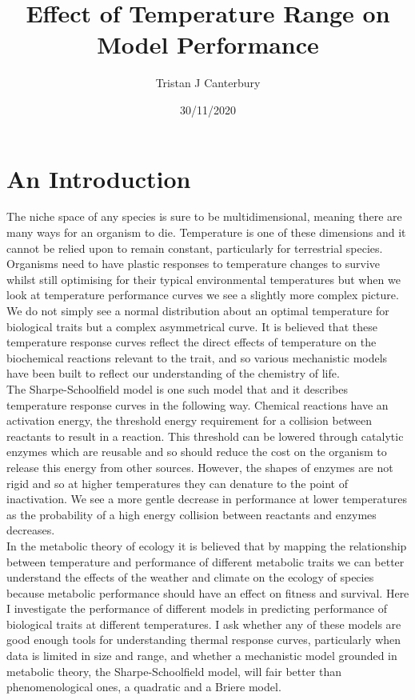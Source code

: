 \documentclass[12pt]{article}
\title{Effect of Temperature Range on Model Performance}
\author{Tristan J Canterbury}
\date{30/11/2020}
\begin{document}
  \maketitle

  \begin{abstract}
  

  \end{abstract}

  \section{An Introduction}
  The niche space of any species is sure to be multidimensional, meaning there are many ways for an organism to die. Temperature is one of these dimensions and it cannot be relied upon to remain constant, particularly for terrestrial species. Organisms need to have plastic responses to temperature changes to survive whilst still optimising for their typical environmental temperatures but when we look at temperature performance curves we see a slightly more complex picture. We do not simply see a normal distribution about an optimal temperature for biological traits but a complex asymmetrical curve. It is believed that these temperature response curves reflect the direct effects of temperature on the biochemical reactions relevant to the trait, and so various mechanistic models have been built to reflect our understanding of the chemistry of life.\\
  The Sharpe-Schoolfield model is one such model that and it describes temperature response curves in the following way. Chemical reactions have an activation energy, the threshold energy requirement for a collision between reactants to result in a reaction. This threshold can be lowered through catalytic enzymes which are reusable and so should reduce the cost on the organism to release this energy from other sources. However, the shapes of enzymes are not rigid and so at higher temperatures they can denature to the point of inactivation. We see a more gentle decrease in performance at lower temperatures as the probability of a high energy collision between reactants and enzymes decreases.\\
  In the metabolic theory of ecology it is believed that by mapping the relationship between temperature and performance of different metabolic traits we can better understand the effects of the weather and climate on the ecology of species because metabolic performance should have an effect on fitness and survival. 
  Here I investigate the performance of different models in predicting performance of biological traits at different temperatures. I ask whether any of these models are good enough tools for understanding thermal response curves, particularly when data is limited in size and range, and whether a mechanistic model grounded in metabolic theory, the Sharpe-Schoolfield model, will fair better than phenomenological ones, a quadratic and a Briere model.\\
\end{document}
